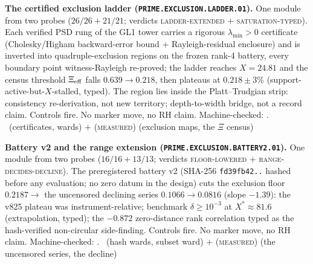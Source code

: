 \par\smallskip\noindent\textbf{The certified exclusion ladder
(\texttt{PRIME.EXCLUSION.LADDER.01}).}
One module from two probes ($26/26 + 21/21$; verdicts
\textsc{ladder-extended} $+$ \textsc{saturation-typed}).  Each
verified PSD rung of the GL1 tower carries a rigorous
$\lambda_{\min} > 0$ certificate (Cholesky/Higham backward-error
bound $+$ Rayleigh-residual enclosure) and is inverted into
quadruple-exclusion regions on the frozen rank-4 battery, every
boundary point witness-Rayleigh re-proved; the ladder reaches
$X = 24.81$ and the census threshold $\Xi_{\rm eff}$ falls
$0.639 \to 0.218$, then plateaus at $0.218 \pm 3\%$
(support-active-but-$X$-stalled, typed).  The region lies inside
the Platt--Trudgian strip: consistency re-derivation, not new
territory; depth-to-width bridge, not a record claim.  Controls
fire.  No marker move, no RH claim.
Machine-checked: .
\mE\ (certificates, wards) $+$ (\textsc{measured}) (exclusion
maps, the $\Xi$ census)
\par\smallskip


\par\smallskip\noindent\textbf{Battery v2 and the range extension
(\texttt{PRIME.EXCLUSION.BATTERY2.01}).}
One module from two probes ($16/16 + 13/13$; verdicts
\textsc{floor-lowered} $+$ \textsc{range-decides-decline}).  The
preregistered battery v2 (SHA-256 \texttt{fd39fb42..} hashed
before any evaluation; no zero datum in the design) cuts the
exclusion floor $0.2187 \to$ the uncensored declining series
$0.1066 \to 0.0816$ (slope $-1.39$): the v825 plateau was
instrument-relative; benchmark $\delta \ge 10^{-3}$ at
$X^* \approx 81.6$ (extrapolation, typed); the $-0.872$
zero-distance rank correlation typed as the hash-verified
non-circular side-finding.  Controls fire.  No marker move, no
RH claim.
Machine-checked: .
\mE\ (hash wards, subset ward) $+$ (\textsc{measured}) (the
uncensored series, the decline)
\par\smallskip



